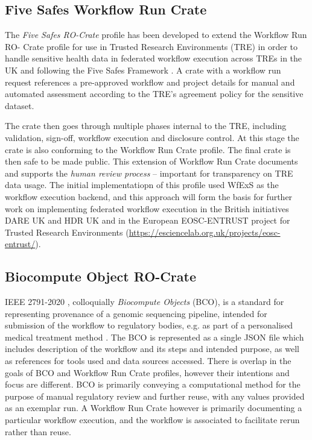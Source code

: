 \documentclass[10pt,letterpaper]{article}
\begin{document}
\subsection{Five Safes Workflow Run Crate}\label{trusted-workflow-run-crate}

The \emph{Five Safes RO-Crate} \cite{5s-crate} profile has been developed to extend the Workflow Run RO- Crate profile for use in Trusted Research Environments (TRE) in order to handle sensitive health data in federated workflow execution across TREs in the UK \cite{trefx} and following the Five Safes Framework \cite{Desai 2016}.
A crate with a workflow run request references a pre-approved workflow and project details for manual and automated assessment according to the TRE's agreement policy for the sensitive dataset. 

The crate then goes through multiple phases internal to the TRE, including validation, sign-off, workflow execution and disclosure control.
At this stage the crate is also conforming to the Workflow Run Crate profile.
The final crate is then safe to be made public.
This extension of Workflow Run Crate documents and supports the \emph{human review process} -- important for transparency on TRE data usage. 
The initial implementatiopn of this profile used WfExS as the workflow execution backend, and this approach will form the basis for further work on implementing federated workflow execution in the British initiatives DARE UK and HDR UK \cite{Snowley 2023} and in the European EOSC-ENTRUST project for Trusted Research Environments (\url{https://esciencelab.org.uk/projects/eosc-entrust/}).


\subsection{Biocompute Object RO-Crate}\label{bco-crate}
IEEE 2791-2020 \cite{Mazumder 2020}, colloquially \emph{Biocompute Objects} (BCO), is a standard for representing provenance of a genomic sequencing pipeline, intended for submission of the workflow to regulatory bodies, e.g. as part of a personalised medical treatment method \cite{Alterovitz 2018}. 
The BCO is represented as a single JSON file which includes description of the workflow and its steps and intended purpose, as well as references for tools used and data sources accessed. 
There is overlap in the goals of BCO and Workflow Run Crate profiles, however their intentions and focus are different. 
BCO is primarily conveying a computational method for the purpose of manual regulatory review and further reuse, with any values provided as an exemplar run.  
A Workflow Run Crate however is primarily documenting a particular workflow execution, and the workflow is associated to facilitate rerun rather than reuse. 
\end{document}
